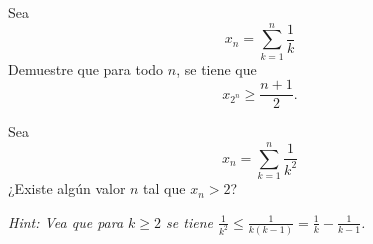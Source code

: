 \documentclass{ayudantia}
\begin{document}
\begin{ans}
    \begin{sol}

    \end{sol}
\end{ans}


\begin{prob}
    Sea
    \begin{equation*}
        x_n=\sum_{k=1}^n\frac1k
    \end{equation*}
    Demuestre que para todo \(n\), se tiene que
    \begin{equation*}
        x_{2^n}\geq\frac{n+1}2.
    \end{equation*}
\end{prob}

\begin{ans}
    \begin{sol}

    \end{sol}
\end{ans}


\begin{prob}
    Sea
    \begin{equation*}
        x_n=\sum_{k=1}^n\frac1{k^2}
    \end{equation*}
    ¿Existe algún valor \(n\) tal que \(x_n>2\)?

    \noindent\textit{Hint: Vea que para \(k\geq2\) se tiene \(\frac1{k^2}\leq\frac1{k(k-1)}=\frac1k-\frac1{k-1}\).}
\end{prob}

\begin{ans}
    \begin{sol}

    \end{sol}
\end{ans}
\end{document}
